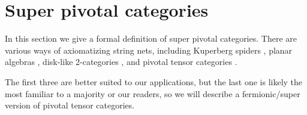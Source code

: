 \documentclass[12pt,a4paper]{article}
\newcommand{\tp}{\otimes}
\newcommand{\dave}[1]{{\color{ao(english)}\footnotesize{(DA) #1}}}
\begin{document}









\section{Super pivotal categories}  \label{def_sect}

In this section we give a formal definition of super pivotal categories.
There are various ways of axiomatizing string nets, including Kuperberg spiders \cite{kup_spider}, 
planar algebras \cite{jones_pa},
disk-like 2-categories \cite{blob_paper}, and pivotal tensor categories \cite{kitaev2006}.

The first three are better suited to our applications, but the last one is likely the most familiar to a majority or our readers,
so we will describe a fermionic/super version of pivotal tensor categories.
\end{document}
